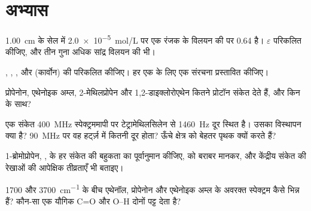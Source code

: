 \section{अभ्यास}

\begin{exercise}[$\star$]\label{exo:b1:structure-spectroscopy:1}
\qty{1.00}{cm} के सेल में \qty{2.0e-5}{mol/L} पर एक रंजक के विलयन की
 पर  0.64 है। $\varepsilon$ परिकलित कीजिए, और
तीन गुना अधिक सांद्र विलयन की  भी।
\end{exercise}

\begin{exercise}[$\star$]\label{exo:b1:structure-spectroscopy:2}
, , ,
 और  (कार्वोन) की  परिकलित कीजिए। हर एक के लिए एक संरचना प्रस्तावित कीजिए।
\end{exercise}

\begin{exercise}[$\star$]\label{exo:b1:structure-spectroscopy:3}
प्रोपेनोन, एथेनोइक
अम्ल, 2-मेथिलप्रोपेन और 1,2-डाइक्लोरोएथेन कितने प्रोटॉन संकेत देते हैं, और किन  के साथ?
\end{exercise}

\begin{exercise}[$\star$]\label{exo:b1:structure-spectroscopy:4}
एक संकेत \qty{400}{MHz} स्पेक्ट्रममापी पर टेट्रामेथिलसिलेन से \qty{1460}{Hz} दूर
स्थित है। उसका विस्थापन क्या है? \qty{90}{MHz} पर वह हर्ट्ज़ में कितनी दूर
होता? ऊँचे क्षेत्र  को बेहतर पृथक क्यों करते हैं?
\end{exercise}

\begin{exercise}[$\star\star$]\label{exo:b1:structure-spectroscopy:5}
1-ब्रोमोप्रोपेन, , के हर संकेत की बहुकता का पूर्वानुमान कीजिए,
 को बराबर मानकर, और केंद्रीय संकेत की रेखाओं की आपेक्षिक
तीव्रताएँ भी बताइए।
\end{exercise}

\begin{exercise}[$\star\star$]\label{exo:b1:structure-spectroscopy:6}
1700 और \qty{3700}{cm^{-1}} के बीच एथेनॉल, प्रोपेनोन और एथेनोइक अम्ल के अवरक्त
स्पेक्ट्रम कैसे भिन्न हैं? कौन-सा एक यौगिक C=O और O--H
दोनों पट्ट देता है?
\end{exercise}


